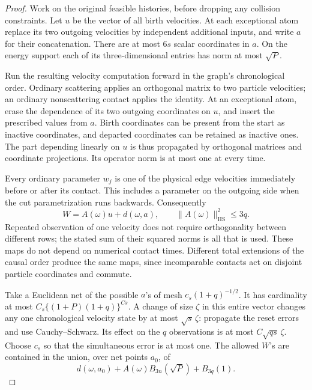 \begin{proof}
Work on the original feasible histories, before dropping any
collision constraints.  Let \(u\) be the vector of all birth
velocities.  At each exceptional atom replace its two outgoing
velocities by independent additional inputs, and write \(a\)
for their concatenation.  There are at most \(6s\) scalar
coordinates in \(a\).  On the energy support each of its
three-dimensional entries has norm at most \(\sqrt P\).

Run the resulting velocity computation forward in the graph's
chronological order.  Ordinary scattering applies an orthogonal
matrix to two particle velocities; an ordinary nonscattering
contact applies the identity.  At an exceptional atom, erase
the dependence of its two outgoing coordinates on \(u\), and
insert the prescribed values from \(a\).  Birth coordinates
can be present from the start as inactive coordinates, and
departed coordinates can be retained as inactive ones.
The part depending linearly on \(u\) is thus propagated by
orthogonal matrices and coordinate projections.  Its operator
norm is at most one at every time.

Every ordinary parameter \(w_j\) is one of the physical edge
velocities immediately before or after its contact.  This
includes a parameter on the outgoing side when the cut
parametrization runs backwards.  Consequently
\begin{equation}\label{eq:cutoff-forward-rows}
 W=A(\omega)u+d(\omega,a),\qquad
 \|A(\omega)\|_{\mathrm{HS}}^2\leq3q .
\end{equation}
Repeated observation of one velocity does not require
orthogonality between different rows; the stated sum of
their squared norms is all that is used.
These maps do not depend on numerical contact times.
Different total extensions of the causal order produce the
same maps, since incomparable contacts act on disjoint
particle coordinates and commute.

Take a Euclidean net of the possible \(a\)'s of mesh
\(c_s(1+q)^{-1/2}\).  It has cardinality at most
\(C_s\{(1+P)(1+q)\}^{Cs}\).
A change of size \(\zeta\) in this entire vector changes
any one chronological velocity state by at most
\(\sqrt s\,\zeta\): propagate the reset errors and use
Cauchy--Schwarz.  Its effect on the \(q\) observations is
at most \(C\sqrt{qs}\,\zeta\).
Choose \(c_s\) so that the simultaneous error is at most one.
The allowed \(W\)'s are contained in the union, over net
points \(a_0\), of
\begin{equation}\label{eq:cutoff-ellipsoid-set}
 d(\omega,a_0)+A(\omega)B_{3n}(\sqrt P)+B_{3q}(1).
\end{equation}


\end{proof}
